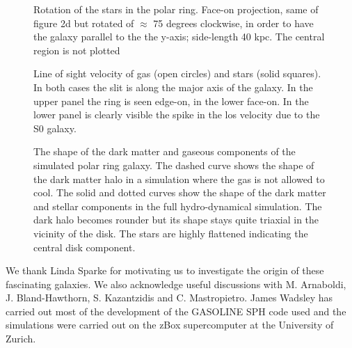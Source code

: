 \documentclass[preprint]{aastex}
\begin{document}
\begin{figure}[t]
\centerline{\epsfxsize=3.2in }
\caption{Rotation of the stars in the polar ring. Face-on projection,
   same of figure 2d but rotated of $\approx$ 75 degrees clockwise, 
in order to have the galaxy parallel to the the y-axis; side-length 40 kpc. 
The central region is not plotted}
\end{figure}
\label{fig:rot1}
%
\begin{figure}[t]
\centerline{\epsfxsize=3.2in }
\caption{Line of sight velocity of gas (open circles) and stars (solid
  squares). In both cases the slit is along the major axis of the galaxy. 
  In the upper panel the ring is seen edge-on, in the lower face-on. 
  In the lower panel is clearly visible the  spike in the los velocity due to 
  the S0 galaxy.}
\label{fig:rot2}
\end{figure}
%
\begin{figure}[t]
\centerline{\epsfxsize=3.2in }
\caption{The shape of the dark matter and gaseous components of the 
simulated polar ring galaxy. The dashed curve shows the shape of
the dark matter halo in a simulation where the gas is not allowed to cool.
The solid and dotted curves show the shape of
the dark matter and stellar components in the full hydro-dynamical simulation.
The dark halo becomes rounder but its shape stays quite triaxial in the vicinity
of the disk. The stars are highly flattened indicating the central disk component.}
\label{fig:shape}
\end{figure}
%



\acknowledgments
We thank Linda Sparke for motivating us to investigate
the origin of these fascinating galaxies. We also acknowledge useful
discussions with M. Arnaboldi, J. Bland-Hawthorn, S. Ka\-zant\-zi\-dis and C. Mastropietro.
James Wadsley has carried out most of the development of the
GASOLINE SPH code used and the simulations were carried out on the zBox
supercomputer at the University of Zurich.
\end{document}
